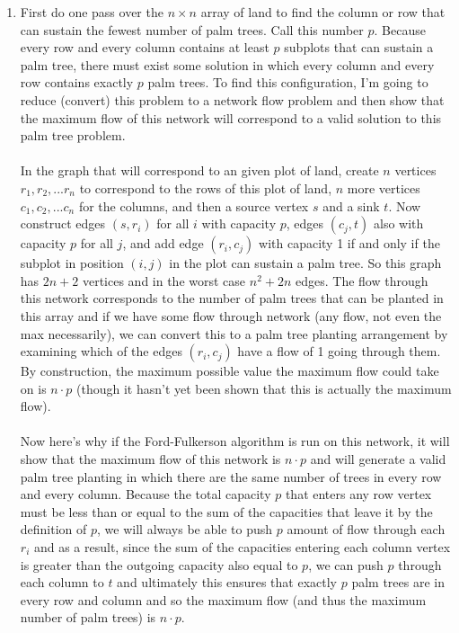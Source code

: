 \documentclass{article}
\begin{document}
\begin{enumerate}
	\item First do one pass over the $n\times n$ array of land to find the column or row that can sustain the fewest number of palm trees.  Call this number $p$.  Because every row and every column contains at least $p$ subplots that can sustain a palm tree, there must exist some solution in which every column and every row contains exactly $p$ palm trees.  To find this configuration, I'm going to reduce (convert) this problem to a network flow problem and then show that the maximum flow of this network will correspond to a valid solution to this palm tree problem.  \\\\
	
	In the graph that will correspond to an given plot of land, create $n$ vertices $r_1, r_2,...r_n$ to correspond to the rows of this plot of land, $n$ more vertices $c_1, c_2, ... c_n$ for the columns, and then a source vertex $s$ and a sink $t$.  Now construct edges $(s, r_i)$ for all $i$ with capacity $p$, edges $(c_j, t)$ also with capacity $p$ for all $j$, and add edge $(r_i, c_j)$ with capacity 1 if and only if the subplot in position $(i,j)$ in the plot can sustain a palm tree. So this graph has $2n+2$ vertices and in the worst case $n^2 + 2n$ edges.  The flow through this network corresponds to the number of palm trees that can be planted in this array and if we have some flow through network (any flow, not even the max necessarily), we can convert this to a palm tree planting arrangement by examining which of the edges $(r_i, c_j)$ have a flow of 1 going through them. By construction, the maximum possible value the maximum flow could take on is $n\cdot p$ (though it hasn't yet been shown that this is actually the maximum flow).  \\\\
	
	Now here's why if the Ford-Fulkerson algorithm is run on this network, it will show that the maximum flow of this network is $n\cdot p$ and will generate a valid palm tree planting in which there are the same number of trees in every row and every column.  Because the total capacity $p$ that enters any row vertex must be less than or equal to the sum of the capacities that leave it by the definition of $p$, we will always be able to push $p$ amount of flow through each $r_i$ and as a result, since the sum of the capacities entering each column vertex is greater than the outgoing capacity also equal to $p$, we can push $p$ through each column to $t$ and ultimately this ensures that exactly $p$ palm trees are in every row and column and so the maximum flow (and thus the maximum number of palm trees) is $n\cdot p$.  \\
	

\end{enumerate}
\end{document}
